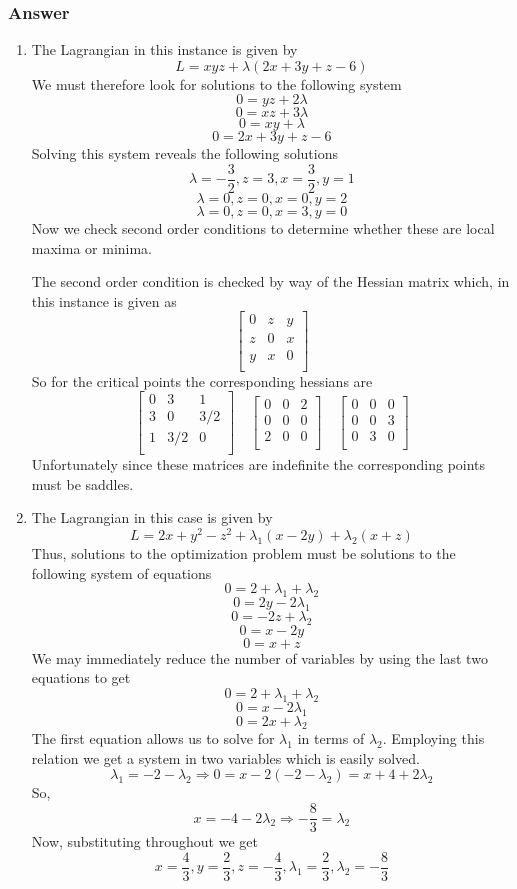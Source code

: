 \documentclass[12pt]{article}
\begin{document}
\subsubsection{Answer}
\begin{enumerate}
\item The Lagrangian in this instance is given by
\[ L= x y z + \lambda \left( 2x+3y+z-6 \right)\]
We must therefore look for solutions to the following system
\[0=y z + 2 \lambda  \]
\[0=x z + 3 \lambda  \]
\[0= xy  +  \lambda  \]
\[0=2 x +3 y +z-6 \]
Solving this system reveals the following solutions
\[ \lambda= -\frac{3}{2},z= 3,x= \frac{3}{2},y= 1 \]
\[\lambda= 0,z= 0,x= 0,y= 2\]
\[\lambda= 0,z= 0,x= 3,y= 0\]
Now we check second order conditions to determine whether these are local maxima or minima.

The second order condition is checked by way of the Hessian matrix which, in this instance is given as 
\[\left[
\begin{array}{lcr}
0&z&y\\
z&0&x\\
y&x&0\\
\end{array}\right]
\] 
So for the critical points the corresponding hessians are
\[\left[
\begin{array}{lcr}
0&3&1\\
3&0&3/2\\
1&3/2&0\\
\end{array}\right]
\quad
\left[
\begin{array}{lcr}
0&0&2\\
0&0&0\\
2&0&0\\
\end{array}\right]
\quad
\left[
\begin{array}{lcr}
0&0&0\\
0&0&3\\
0&3&0\\
\end{array}\right]
\] 
Unfortunately since these matrices are indefinite the corresponding points must be saddles.
\item
The Lagrangian in this case is given by
\[ L= 2x +y^2 - z^2 + \lambda_1 \left( x-2y \right) + \lambda_2 \left( x +z \right)\]
Thus, solutions to the optimization problem must be solutions to the following system of equations
\[0=2+ \lambda_1+\lambda_2\]
\[0=2y-2 \lambda_1\]
\[0=-2z+\lambda_2\]
\[0=x-2y\]
\[0=x+z\]
We may immediately reduce the number of variables by using the last two equations to get
\[0=2+ \lambda_1+\lambda_2\]
\[0=x-2 \lambda_1\]
\[0=2x+\lambda_2\]
The first equation allows us to solve for $\lambda_1$ in terms of $\lambda_2$. Employing this relation we get a system in two variables which is easily solved.
\[\lambda_1=-2-\lambda_2 \Rightarrow 0 = x-2\left( -2-\lambda_2 \right) =x+ 4+2 \lambda_2\]
So, 
\[x=-4-2 \lambda_2 \Rightarrow -\frac{8}{3} = \lambda_2 \]
Now, substituting throughout we get
\[x= \frac{4}{3},y= \frac{2}{3},z= -\frac{4}{3}, \lambda_1 = \frac{2}{3}, \lambda_2 = -\frac{8}{3}\]


\end{enumerate}
\end{document}
